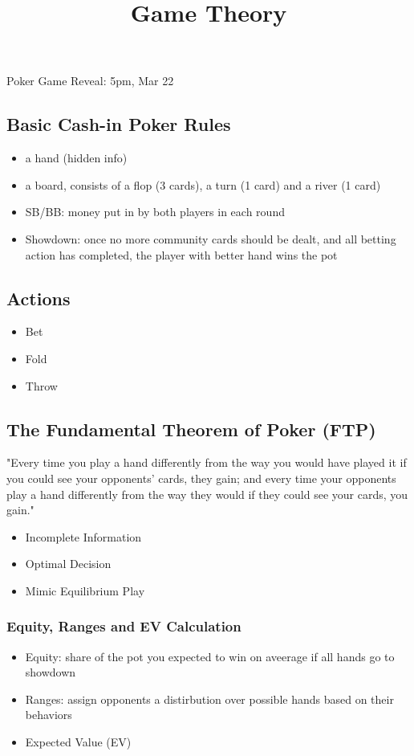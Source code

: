 \documentclass[openany]{memoir}
\begin{document}
	\title{Game Theory}
	\maketitle
	Poker Game Reveal: 5pm, Mar 22
	\subsection{Basic Cash-in Poker Rules}
	\begin{itemize}
			\item a hand (hidden info)		
			\item a board, consists of a flop (3 cards), a turn (1 card) and a river (1 card)
		\item SB/BB: money put in by both players in each round
		\item Showdown: once no more community cards should be dealt, and all betting action has completed, the player with better hand wins the pot
\end{itemize}
	\subsection{Actions}
	\begin{itemize}
			\item Bet
			\item Fold
		\item Throw
	\end{itemize}
	\subsection{The Fundamental Theorem of Poker (FTP)}
	"Every time you play a hand differently from the way you would have played it if you could see your opponents’ cards, they gain; and every time your opponents play a hand differently from the way they would if they could see your cards, you gain."
	\begin{itemize}
		\item Incomplete Information
		\item Optimal Decision 
		\item Mimic Equilibrium Play
\end{itemize}
	\subsubsection{Equity, Ranges and EV Calculation}
	\begin{itemize}
		\item Equity: share of the pot you expected to win on aveerage if all hands go to showdown
		\item Ranges: assign opponents a distirbution over possible hands based on their behaviors
		\item Expected Value (EV)
	\end{itemize}
\end{document}
